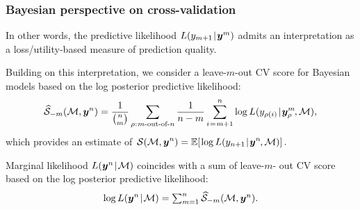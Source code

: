 \documentclass[18pt]{beamer}
\newcommand{\defineTightSpacing}{%
	\setlength{\abovedisplayskip}{.25\baselineskip}%
	\setlength{\belowdisplayskip}{.25\baselineskip}%
}
\renewcommand{\textsc}[1]{{\small \MakeUppercase{#1}}}
\newcommand{\given}{\thinnerspace | \thinnerspace}
\newcommand{\spacedColon}{\mkern .5mu : \mkern 1mu}
\newcommand{\thinnerspace}{\mskip.5\thinmuskip}
\newcommand{\negthinnerspace}{\mskip-.5\thinmuskip}
\newcommand{\expectation}{\mathbb{E}}
\newcommand{\likelihood}{L}
\newcommand{\by}{\bm{y}}
\newcommand{\loss}{\mathcal{L}}
\newcommand{\score}{\mathcal{S}}
\newcommand{\modelSymbol}{\mathcal{M}}
\newcommand{\permutation}{\rho}
\newcommand{\trainingSize}{m}
\newcommand{\testSampleIndex}{i}
\newcommand{\testOutcome}{y_{\permutation(\testSampleIndex)}} %
\newcommand{\testOutcomePredicted}{\widehat{y}_{\permutation(\testSampleIndex)}^{\, \trainingSize}}
\begin{document}
\begin{frame}
\frametitle{Bayesian perspective on cross-validation}
In other words, the predictive likelihood $\likelihood(y_{\trainingSize + 1} \given \by^\trainingSize)$ admits an interpretation as a loss/utility-based measure of prediction quality.

\pause
Building on this interpretation, we consider a leave-$\trainingSize$-out \textsc{CV} score for Bayesian models based on the log posterior predictive likelihood:
\begin{equation*} \defineTightSpacing%
\widehat{\score}_{-\trainingSize}(\modelSymbol, \by^n) =
	\frac{1}{{n \choose \trainingSize}} \sum_{\permutation \spacedColon \text{$\trainingSize$-out-of-$n$}}
	\frac{1}{n - \trainingSize}\sum_{\testSampleIndex \thinnerspace = \thinnerspace \trainingSize + 1}^n
	\log \likelihood(y_{\permutation(\testSampleIndex)} \given \by_\permutation^\trainingSize\negthinnerspace, \modelSymbol),
\end{equation*}
\pause%
which provides an estimate of
$\displaystyle \thinnerspace
\score(\modelSymbol, \by^n)
= \expectation\!\left[
	\thinnerspace \log \likelihood(y_{n + 1} \given \by^n\negthinnerspace, \modelSymbol)
\right].$

\pause
\smallskip
\begin{theorem}
\normalfont
Marginal likelihood $\likelihood(\by^n \given \modelSymbol)$ coincides with a sum of leave-$\trainingSize$- out \textsc{CV} score based on the log posterior predictive likelihood:
\begin{equation*} \defineTightSpacing%
\log \likelihood(\by^n \given \modelSymbol)
	= \textstyle \sum_{\trainingSize = 1}^n \widehat{\score}_{-\trainingSize}(\modelSymbol, \by^n).
\end{equation*}
\end{theorem}
\end{frame}
\end{document}
